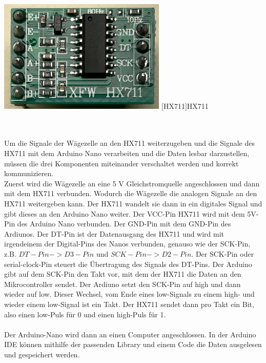 \begin{center}
    \centering
    \includegraphics[width=0.6\textwidth]{img/HX711.png}
    [HX711]{HX711 \cite{prilchen}}\label{HX711}
\end{center}
\\
\\
Um die Signale der Wägezelle an den HX711 weiterzugeben und die Signale des HX711 mit dem Arduino Nano verarbeiten und die Daten lesbar darzustellen, müssen die drei Komponenten miteinander verschaltet werden und korrekt kommunizieren. \\
Zuerst wird die Wägezelle an eine 5 V Gleichstromquelle angeschlossen und dann mit dem HX711 verbunden. Wodurch die Wägezelle die analogen Signale an den HX711 weitergeben kann. Der HX711 wandelt sie dann in ein digitales Signal und gibt dieses an den Arduino Nano weiter. Der VCC-Pin HX711 wird mit dem 5V-Pin des Arduino Nano verbunden. Der GND-Pin mit dem GND-Pin des Ardiunos. Der DT-Pin ist der Datenausgang des HX711 und wird mit irgendeinem der Digital-Pins des Nanos verbunden, genauso wie der SCK-Pin, z.B. $DT-Pin -> D3-Pin$ und $SCK-Pin -> D2-Pin$. Der SCK-Pin oder serial-clock-Pin steuert die Übertragung des Signals des DT-Pins. Der Arduino gibt auf dem SCK-Pin den Takt vor, mit dem der HX711 die Daten an den Mikrocontroller sendet. Der Ardiuno setzt den SCK-Pin auf high und dann wieder auf low. Dieser Wechsel, vom Ende eines low-Signals zu einem high- und wieder einem low-Signal ist ein Takt. Der HX711 sendet dann pro Takt ein Bit, also einen low-Puls für 0 und einen high-Puls für 1. \\
\\
Der Arduino-Nano wird dann an einen Computer angeschlossen.
In der Arduino IDE können mithilfe der passenden Library und einem Code die Daten ausgelesen und gespeichert werden.
